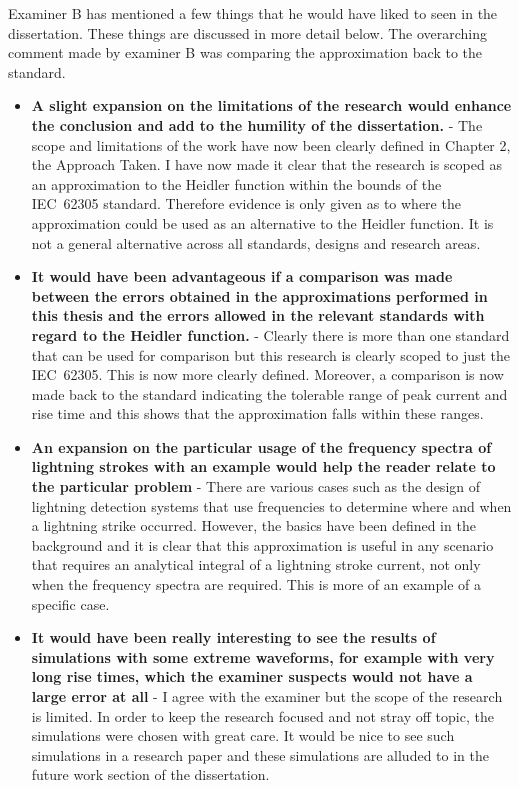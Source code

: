 \documentclass[11pt,a4paper]{letter} %
\begin{document}
Examiner B has mentioned a few things that he would have liked to seen in the dissertation. These things are discussed in more detail below. The overarching comment made by examiner B was comparing the approximation back to the standard.
\begin{itemize}
	\item \textbf{A slight expansion on the limitations of the research would enhance the conclusion and add to the humility of the dissertation.} - The scope and limitations of the work have now been clearly defined in Chapter 2, the Approach Taken. I have now made it clear that the research is scoped as an approximation to the Heidler function within the bounds of the IEC~62305 standard. Therefore evidence is only given as to where the approximation could be used as an alternative to the Heidler function. It is not a general alternative across all standards, designs and research areas.
	\item \textbf{It would have been advantageous if a comparison was made between the errors obtained in the approximations performed in this thesis and the errors allowed in the relevant standards with regard to the Heidler function.} - Clearly there is more than one standard that can be used for comparison but this research is clearly scoped to just the IEC~62305. This is now more clearly defined. Moreover, a comparison is now made back to the standard indicating the tolerable range of peak current and rise time and this shows that the approximation falls within these ranges.
	\item \textbf{An expansion on the particular usage of the frequency spectra of lightning strokes with an example would help the reader relate to the particular problem} - There are various cases such as the design of lightning detection systems that use frequencies to determine where and when a lightning strike occurred. However, the basics have been defined in the background and it is clear that this approximation is useful in any scenario that requires an analytical integral of a lightning stroke current, not only when the frequency spectra are required. This is more of an example of a specific case.
	\item \textbf{It would have been really interesting to see the results of simulations with some extreme waveforms, for example with very long rise times, which the examiner suspects would not have a large error at all} - I agree with the examiner but the scope of the research is limited. In order to keep the research focused and not stray off topic, the simulations were chosen with great care. It would be nice to see such simulations in a research paper and these simulations are alluded to in the future work section of the dissertation.
\end{itemize}

\end{document}
